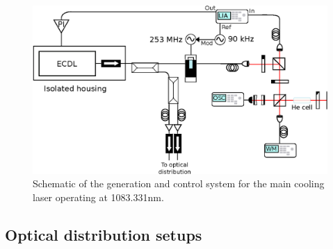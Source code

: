 	\begin{figure}
		\centering
		\includegraphics[width=\textwidth]{fig/apparatus/master_laser_system}
		\caption{Schematic of the generation and control system for the main cooling laser operating at 1083.331nm. }
		\label{fig:main_laser}
	\end{figure}
	



\subsection*{Optical distribution setups}

